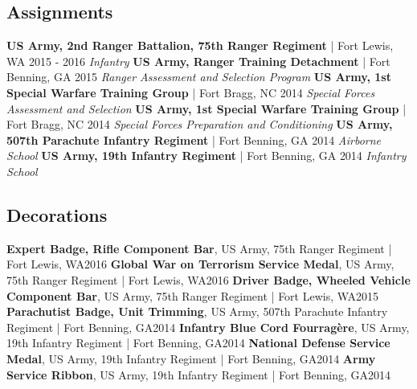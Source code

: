 \documentclass{article}
\begin{document}
    \subsection*{Assignments}
        \textbf{US Army, 2nd Ranger Battalion, 75th Ranger Regiment} | Fort Lewis, WA \hfill{2015 - 2016}\newline
        \textit{Infantry}\newline\newline
        \textbf{US Army, Ranger Training Detachment} | Fort Benning, GA \hfill{2015}\newline
        \textit{Ranger Assessment and Selection Program}\newline\newline
        \textbf{US Army, 1st Special Warfare Training Group} | Fort Bragg, NC \hfill{2014}\newline
        \textit{Special Forces Assessment and Selection}\newline\newline
        \textbf{US Army, 1st Special Warfare Training Group} | Fort Bragg, NC \hfill{2014}\newline
        \textit{Special Forces Preparation and Conditioning}\newline\newline
        \textbf{US Army, 507th Parachute Infantry Regiment} | Fort Benning, GA \hfill{2014}\newline
        \textit{Airborne School}\newline\newline
        \textbf{US Army, 19th Infantry Regiment} | Fort Benning, GA \hfill{2014}\newline
        \textit{Infantry School}
    \subsection*{Decorations}
        \textbf{Expert Badge, Rifle Component Bar}, US Army, 75th Ranger Regiment | Fort Lewis, WA\hfill{2016}\newline
        \textbf{Global War on Terrorism Service Medal}, US Army, 75th Ranger Regiment | Fort Lewis, WA\hfill{2016}\newline
        \textbf{Driver Badge, Wheeled Vehicle Component Bar}, US Army, 75th Ranger Regiment | Fort Lewis, WA\hfill{2015}\newline
        \textbf{Parachutist Badge, Unit Trimming}, US Army, 507th Parachute Infantry Regiment | Fort Benning, GA\hfill{2014}\newline
        \textbf{Infantry Blue Cord Fourragère}, US Army, 19th Infantry Regiment | Fort Benning, GA\hfill{2014}\newline
        \textbf{National Defense Service Medal}, US Army, 19th Infantry Regiment | Fort Benning, GA\hfill{2014}\newline
        \textbf{Army Service Ribbon}, US Army, 19th Infantry Regiment | Fort Benning, GA\hfill{2014}
\end{document}
